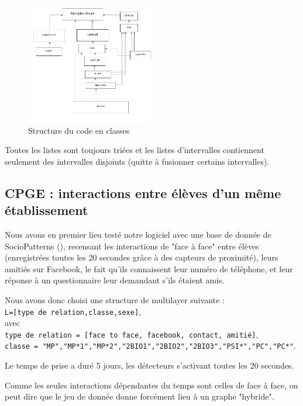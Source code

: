 \documentclass[11pt,a4paper]{article}
\theoremstyle{definition}
\theoremstyle{remark}
\theoremstyle{remark}
\begin{document}
	
	
	\begin{figure}[H]
		\centering
		\includegraphics[width=0.5\textwidth]{codeStructure.JPG}
		\caption{Structure du code en classes }
	\end{figure}
	
	Toutes les listes sont toujours triées et les listes d'intervalles contiennent seulement des intervalles disjoints (quitte à fusionner certains intervalles).
	
	

\subsection{CPGE : interactions entre élèves d'un même établissement}

Nous avons en premier lieu testé notre logiciel avec une base de donnée de SocioPatterns (\cite{cpge}), recensant les interactions de "face à face" entre élèves (enregistrées toutes les 20 secondes grâce à des capteurs de proximité), leurs amitiés sur Facebook, le fait qu'ils connaissent leur numéro de téléphone, et leur réponse à un questionnaire leur demandant s'ils étaient amis.

Nous avons donc choisi une structure de multilayer suivante : \\
{\tt L=[type de relation,classe,sexe]},\\
 avec\\
  {\tt type de relation = [face to face, facebook, contact, amitié]},\\
  {\tt classe = "MP","MP*1","MP*2","2BIO1","2BIO2","2BIO3","PSI*","PC","PC*"}.
  
  Le temps de prise a duré 5 jours, les détecteurs s'activant toutes les 20 secondes.
  
  Comme les seules interactions dépendantes du temps sont celles de face à face, on peut dire que le jeu de donnée donne forcément lieu à un graphe "hybride".
  
\end{document}
